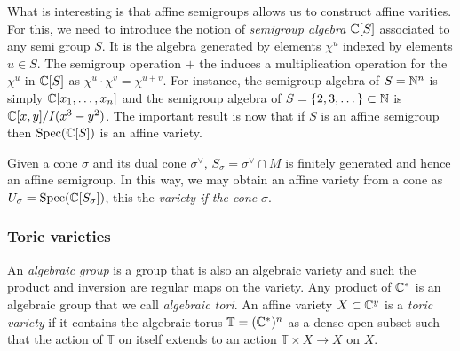             What is interesting is that affine semigroups allows us to construct affine varities. For this, we need to introduce the notion of \emph{semigroup algebra} $\mathbb{C}[S]$ associated to any semi group $S$. It is the algebra generated by elements $\chi^u$ indexed by elements $u\in S$. The semigroup operation $+$ the induces a multiplication operation for the $\chi^u$ in $\mathbb{C}[S]$ as $\chi^u\cdot\chi^v=\chi^{u+v}$. For instance, the semigroup algebra of $S=\mathbb{N}^n$ is simply $\mathbb{C}[x_1,\dots,x_n]$ and the semigroup algebra of $S=\{2,3,\dots\}\subset\mathbb{N}$ is $\mathbb{C}[x,y]/I(x^3-y^2)$. The important result is now that if $S$ is an affine semigroup then $\text{Spec}(\mathbb{C}[S])$ is an affine variety.

            Given a cone $\sigma$ and its dual cone $\sigma^\vee$, $S_\sigma=\sigma^\vee\cap M$ is finitely generated and hence an affine semigroup. In this way, we may obtain an affine variety from a cone as $U_\sigma=\text{Spec}(\mathbb{C}[S_\sigma])$, this the \emph{variety if the cone} $\sigma$.

        \subsubsection{Toric varieties}

            An \emph{algebraic group} is a group that is also an algebraic variety and such the product and inversion are regular maps on the variety. Any product of $\mathbb{C}^*$ is an algebraic group that we call \emph{algebraic tori}. An affine variety $X\subset\mathbb{C}^y$ is a \emph{toric variety} if it contains the algebraic torus $\mathbb{T}=(\mathbb{C}^*)^n$ as a dense open subset such that the action of $\mathbb{T}$ on itself extends to an action $\mathbb{T}\times X\to X$ on $X$.
            
